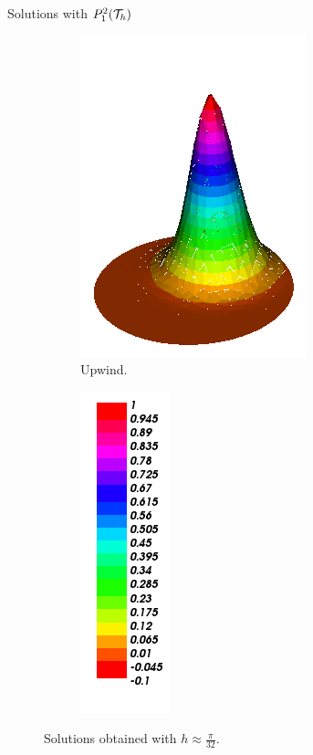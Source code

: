 \begin{frame}{Solutions with $\relax{P}_1^2(\mathcal{T}_h)$}
\begin{figure}[h!]
\begin{subfigure}[b]{0.27\textwidth}
				\includegraphics[scale=0.2]{img/Conveccion_Reaccion/Recortes/steady_convect_react_approx_UPW_n_64.png}
				\caption{Upwind.}
			\end{subfigure}
			\begin{subfigure}[b]{0.15\textwidth}
				\centering
				\includegraphics[scale=0.2]{img/Conveccion_Reaccion/Recortes/steady_convect_react_values.png}
			\end{subfigure}
			\caption{Solutions obtained with $h\approx\frac{\pi}{32}$.}
		\end{figure}
		\end{frame}
		
